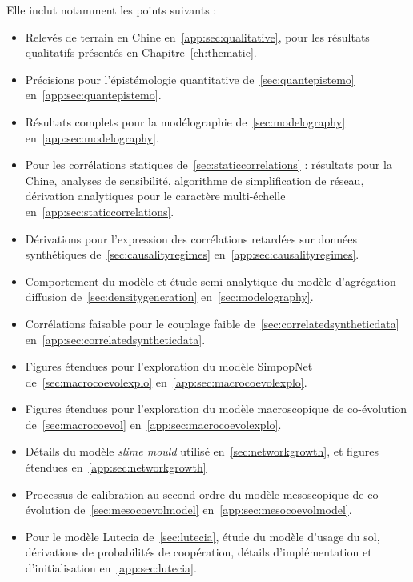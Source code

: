 Elle inclut notamment les points suivants :
\begin{itemize}
	\item Relevés de terrain en Chine en~\ref{app:sec:qualitative}, pour les résultats qualitatifs présentés en Chapitre~\ref{ch:thematic}.
	\item Précisions pour l'épistémologie quantitative de~\ref{sec:quantepistemo} en~\ref{app:sec:quantepistemo}.
	\item Résultats complets pour la modélographie de~\ref{sec:modelography} en~\ref{app:sec:modelography}.
	\item Pour les corrélations statiques de~\ref{sec:staticcorrelations} : résultats pour la Chine, analyses de sensibilité, algorithme de simplification de réseau, dérivation analytiques pour le caractère multi-échelle en~\ref{app:sec:staticcorrelations}.
	\item Dérivations pour l'expression des corrélations retardées sur données synthétiques de~\ref{sec:causalityregimes} en~\ref{app:sec:causalityregimes}.
	\item Comportement du modèle et étude semi-analytique du modèle d'agrégation-diffusion de~\ref{sec:densitygeneration} en~\ref{sec:modelography}.
	\item Corrélations faisable pour le couplage faible de~\ref{sec:correlatedsyntheticdata} en~\ref{app:sec:correlatedsyntheticdata}.
	\item Figures étendues pour l'exploration du modèle SimpopNet de~\ref{sec:macrocoevolexplo} en~\ref{app:sec:macrocoevolexplo}.
	\item Figures étendues pour l'exploration du modèle macroscopique de co-évolution de~\ref{sec:macrocoevol} en~\ref{app:sec:macrocoevolexplo}.
	\item Détails du modèle \emph{slime mould} utilisé en~\ref{sec:networkgrowth}, et figures étendues en~\ref{app:sec:networkgrowth}
	\item Processus de calibration au second ordre du modèle mesoscopique de co-évolution de~\ref{sec:mesocoevolmodel} en~\ref{app:sec:mesocoevolmodel}.
	\item Pour le modèle Lutecia de~\ref{sec:lutecia}, étude du modèle d'usage du sol, dérivations de probabilités de coopération, détails d'implémentation et d'initialisation en~\ref{app:sec:lutecia}.
\end{itemize}


\stars







